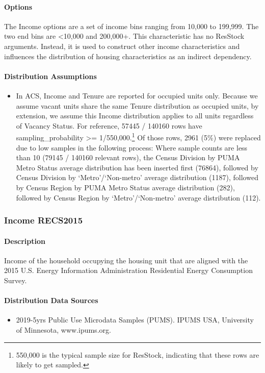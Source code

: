 \paragraph{Options}
The Income options are a set of income bins ranging from 10,000 to 199,999. The two end bins are <10,000 and 200,000+. This characteristic has no ResStock arguments. Instead, it is used to construct other income characteristics and influences the distribution of housing characteristics as an indirect dependency.

\paragraph{Distribution Assumptions}
\begin{itemize}
\item
  In ACS, Income and Tenure are reported for occupied units only.
  Because we assume vacant units share the same Tenure distribution as
  occupied units, by extension, we assume this Income distribution
  applies to all units regardless of Vacancy Status. For reference,
  57445 / 140160 rows have sampling\_probability \textgreater= 1/550,000.\footnote{550,000 is the typical sample size for ResStock, indicating that these rows are likely to get sampled.}
  Of those rows, 2961 (5\%) were replaced due to low samples in the
  following process: Where sample counts are less than 10 (79145 /
  140160 relevant rows), the Census Division by PUMA Metro Status
  average distribution has been inserted first (76864), followed by
  Census Division by
  `Metro'/`Non-metro'
  average distribution (1187), followed by Census Region by PUMA Metro
  Status average distribution (282), followed by Census Region by
  `Metro'/`Non-metro'
  average distribution (112).
\end{itemize}

\subsubsection{Income RECS2015}\label{income_recs2015}
\paragraph{Description}
Income of the household occupying the housing unit that are aligned
with the 2015 U.S. Energy Information Administration Residential Energy
Consumption Survey.

\paragraph{Distribution Data Sources}
\begin{itemize}
\item
  2019-5yrs Public Use Microdata Samples (PUMS). IPUMS USA, University
  of Minnesota, www.ipums.org.
\end{itemize}

